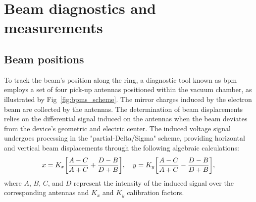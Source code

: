 


\section{Beam diagnostics and measurements}
\subsection{Beam positions}
To track the beam's position along the ring, a diagnostic tool known as \gls*{bpm} employs a set of four pick-up antennas positioned within the vacuum chamber, as illustrated by Fig~\ref{fig:bpms_scheme}. The mirror charges induced by the electron beam are collected by the antennas. The determination of beam displacements relies on the differential signal induced on the antennas when the beam deviates from the device's geometric and electric center. The induced voltage signal undergoes processing in the "partial-Delta/Sigma" scheme, providing horizontal and vertical beam displacements through the following algebraic calculations:
\begin{equation}
    x = K_x \qty[\frac{A-C}{A+C}+\frac{D - B}{D+B}], \quad y = K_y \qty[\frac{A-C}{A+C}-\frac{D - B}{D+B}],
\end{equation}
where $A$, $B$, $C$, and $D$ represent the intensity of the induced signal over the corresponding antennas and $K_x$ and $K_y$ calibration factors. 

